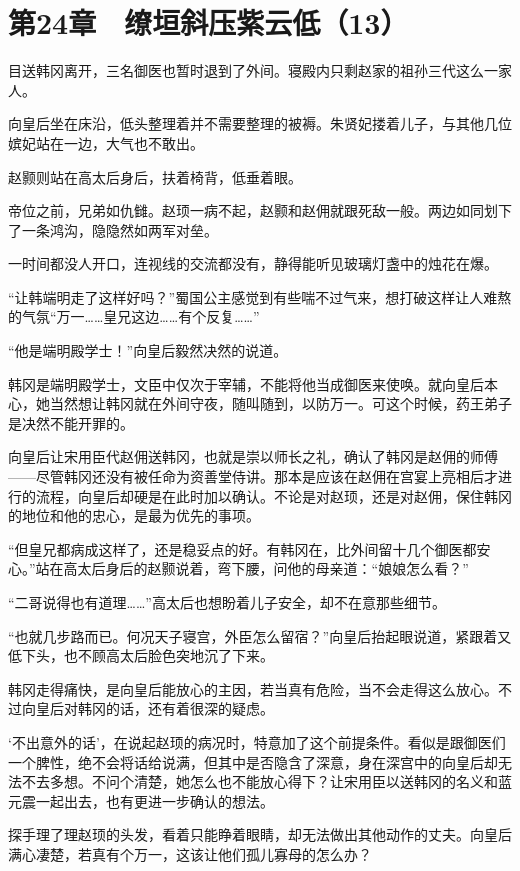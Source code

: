 \section{第24章　缭垣斜压紫云低（13）}

目送韩冈离开，三名御医也暂时退到了外间。寝殿内只剩赵家的祖孙三代这么一家人。

向皇后坐在床沿，低头整理着并不需要整理的被褥。朱贤妃搂着儿子，与其他几位嫔妃站在一边，大气也不敢出。

赵颢则站在高太后身后，扶着椅背，低垂着眼。

帝位之前，兄弟如仇雠。赵顼一病不起，赵颢和赵佣就跟死敌一般。两边如同划下了一条鸿沟，隐隐然如两军对垒。

一时间都没人开口，连视线的交流都没有，静得能听见玻璃灯盏中的烛花在爆。

“让韩端明走了这样好吗？”蜀国公主感觉到有些喘不过气来，想打破这样让人难熬的气氛“万一……皇兄这边……有个反复……”

“他是端明殿学士！”向皇后毅然决然的说道。

韩冈是端明殿学士，文臣中仅次于宰辅，不能将他当成御医来使唤。就向皇后本心，她当然想让韩冈就在外间守夜，随叫随到，以防万一。可这个时候，药王弟子是决然不能开罪的。

向皇后让宋用臣代赵佣送韩冈，也就是崇以师长之礼，确认了韩冈是赵佣的师傅——尽管韩冈还没有被任命为资善堂侍讲。那本是应该在赵佣在宫宴上亮相后才进行的流程，向皇后却硬是在此时加以确认。不论是对赵顼，还是对赵佣，保住韩冈的地位和他的忠心，是最为优先的事项。

“但皇兄都病成这样了，还是稳妥点的好。有韩冈在，比外间留十几个御医都安心。”站在高太后身后的赵颢说着，弯下腰，问他的母亲道：“娘娘怎么看？”

“二哥说得也有道理……”高太后也想盼着儿子安全，却不在意那些细节。

“也就几步路而已。何况天子寝宫，外臣怎么留宿？”向皇后抬起眼说道，紧跟着又低下头，也不顾高太后脸色突地沉了下来。

韩冈走得痛快，是向皇后能放心的主因，若当真有危险，当不会走得这么放心。不过向皇后对韩冈的话，还有着很深的疑虑。

‘不出意外的话’，在说起赵顼的病况时，特意加了这个前提条件。看似是跟御医们一个脾性，绝不会将话给说满，但其中是否隐含了深意，身在深宫中的向皇后却无法不去多想。不问个清楚，她怎么也不能放心得下？让宋用臣以送韩冈的名义和蓝元震一起出去，也有更进一步确认的想法。

探手理了理赵顼的头发，看着只能睁着眼睛，却无法做出其他动作的丈夫。向皇后满心凄楚，若真有个万一，这该让他们孤儿寡母的怎么办？


